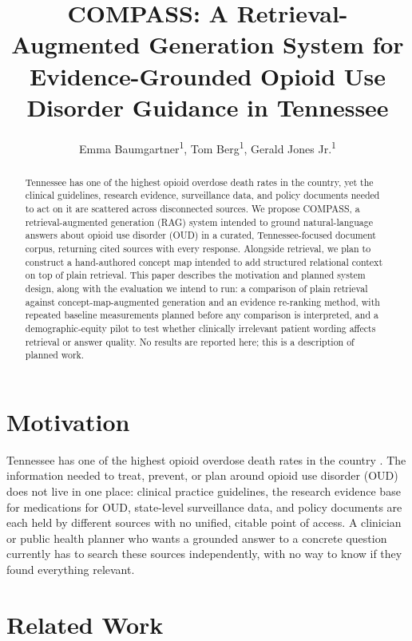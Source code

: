 \documentclass[letterpaper]{article}
\title{COMPASS: A Retrieval-Augmented Generation System for Evidence-Grounded Opioid Use Disorder Guidance in Tennessee}
\author{
    Emma Baumgartner\textsuperscript{\rm 1},
    Tom Berg\textsuperscript{\rm 1},
    Gerald Jones Jr.\textsuperscript{\rm 1}
}
\begin{document}
\maketitle

\begin{abstract}
Tennessee has one of the highest opioid overdose death rates in the country, yet the clinical guidelines, research evidence, surveillance data, and policy documents needed to act on it are scattered across disconnected sources. We propose COMPASS, a retrieval-augmented generation (RAG) system intended to ground natural-language answers about opioid use disorder (OUD) in a curated, Tennessee-focused document corpus, returning cited sources with every response. Alongside retrieval, we plan to construct a hand-authored concept map intended to add structured relational context on top of plain retrieval. This paper describes the motivation and planned system design, along with the evaluation we intend to run: a comparison of plain retrieval against concept-map-augmented generation and an evidence re-ranking method, with repeated baseline measurements planned before any comparison is interpreted, and a demographic-equity pilot to test whether clinically irrelevant patient wording affects retrieval or answer quality. No results are reported here; this is a description of planned work.
\end{abstract}

\section{Motivation}

Tennessee has one of the highest opioid overdose death rates in the country \citep{tdh2025}. The information needed to treat, prevent, or plan around opioid use disorder (OUD) does not live in one place: clinical practice guidelines, the research evidence base for medications for OUD, state-level surveillance data, and policy documents are each held by different sources with no unified, citable point of access. A clinician or public health planner who wants a grounded answer to a concrete question currently has to search these sources independently, with no way to know if they found everything relevant.

\section{Related Work}
\end{document}
